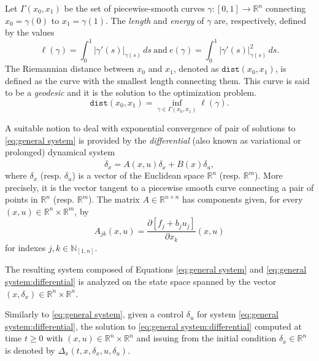\documentclass[10pt,twocolumn,twoside]{IEEEtran}
\theoremstyle{plain}
\theoremstyle{definition}
\theoremstyle{remark}
\begin{document}
Let $\Gamma(x_0,x_1)$ be the set of piecewise-smooth curves $\gamma:[0,1]\to\mathbb{R}^n$ connecting $x_0=\gamma(0)$ to $x_1=\gamma(1)$. The \emph{length} and \emph{energy} of $\gamma$ are, respectively, defined by the values
\begin{equation*}
	\ell(\gamma)=\int_0^1|\gamma'(s)|_{\gamma(s)}\,ds\ \text{and}\ e(\gamma)=\int_0^1|\gamma'(s)|_{\gamma(s)}^2\,ds.
\end{equation*}
The Riemannian distance between $x_0$ and $x_1$, denoted as $\mathbin{\mathtt{dist}}(x_0,x_1)$, is defined as the curve with the smallest length connecting them. This curve is said to be a \emph{geodesic} and it is the solution to the optimization problem.
\begin{equation}\label{eq:geodesic formulation}
	\mathbin{\mathtt{dist}}(x_0,x_1)=\inf_{\gamma\in\Gamma(x_0,x_1)}\ell(\gamma).
\end{equation}

A suitable notion to deal with exponential convergence of pair of solutions to \eqref{eq:general system} is provided by the \emph{differential} (also known as variational or prolonged) dynamical system
\begin{equation}\label{eq:general system:differential}
	\dot{\delta}_x=A(x,u)\delta_x+B(x)\delta_u,
\end{equation}
where $\delta_x$ (resp. $\delta_u$) is a vector of the Euclidean space $\mathbb{R}^n$ (resp. $\mathbb{R}^m$). More precisely, it is the vector tangent to a piecewise smooth curve connecting a pair of points in $\mathbb{R}^n$ (resp. $\mathbb{R}^m$). The matrix $A\in\mathbb{R}^{n\times n}$ has components given, for every $(x,u)\in\mathbb{R}^n\times\mathbb{R}^m$, by 
\begin{equation*}
	A_{jk}(x,u)=\dfrac{\partial[f_j+b_ju_j]}{\partial x_k}(x,u)	
\end{equation*}
for indexes $j,k\in\mathbb{N}_{[1,n]}$. 

The resulting system composed of Equations \eqref{eq:general system} and \eqref{eq:general system:differential} is analyzed on the state space spanned by the vector $(x,\delta_x)\in\mathbb{R}^n\times\mathbb{R}^n$. 

Similarly to \eqref{eq:general system}, given a control $\delta_u$ for system \eqref{eq:general system:differential}, the solution to \eqref{eq:general system:differential} computed at time $t\geq0$ with $(x,u)\in\mathbb{R}^n\times\mathbb{R}^n$ and issuing from the  initial condition $\delta_x\in\mathbb{R}^n$ is denoted by $\Delta_x(t,x,\delta_x,u,\delta_u)$. 
\end{document}
